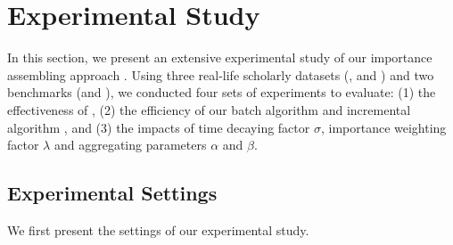 \section{Experimental Study}
\label{sec-exp}

In this section, we present an extensive experimental study of our importance assembling approach \ensemblerank.
Using three real-life scholarly datasets (\aan, \aminer and \magdata) and two benchmarks (\recom and \fcita), we conducted four sets of experiments to evaluate: (1) the effectiveness of \ensemblerank,
(2) the efficiency of our batch algorithm \batensemble and incremental algorithm \incensemble, and (3) the impacts of time decaying factor $\sigma$, importance weighting factor $\lambda$ and aggregating parameters $\alpha$ and $\beta$.



\subsection{Experimental Settings}

We first present the settings of our experimental study.

